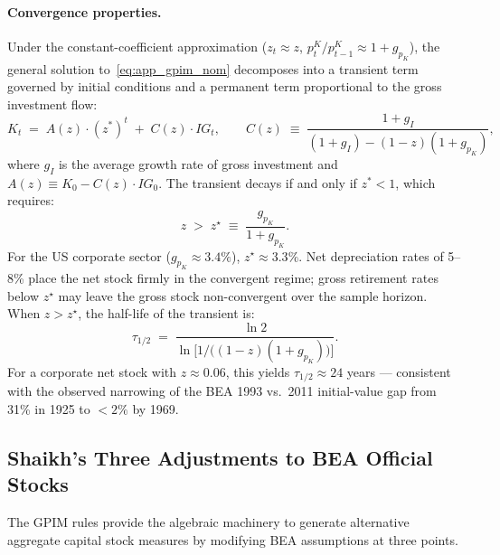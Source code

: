\paragraph{Convergence properties.}
Under the constant-coefficient approximation
($z_t \approx z$, $p_t^{K}/p_{t-1}^{K} \approx 1 + g_{p_K}$), the
general solution to~\eqref{eq:app_gpim_nom} decomposes into a transient
term governed by initial conditions and a permanent term proportional to
the gross investment flow:
%
\begin{equation}
  \label{eq:app_gen_solution}
  K_t \;=\; A(z)\cdot(z^{\ast})^t \;+\; C(z)\cdot IG_t,
  \qquad
  C(z) \;\equiv\;
  \frac{1+g_I}{(1+g_I)-(1-z)(1+g_{p_K})},
\end{equation}
%
where $g_I$ is the average growth rate of gross investment and
$A(z) \equiv K_0 - C(z)\cdot IG_0$. The transient decays if and only if
$z^{\ast} < 1$, which requires:
%
\begin{equation}
  \label{eq:app_critical_z}
  z \;>\; z^{\star} \;\equiv\; \frac{g_{p_K}}{1+g_{p_K}}.
\end{equation}
%
For the US corporate sector ($g_{p_K} \approx 3.4\%$),
$z^{\star} \approx 3.3\%$. Net depreciation rates of 5--8\% place the
net stock firmly in the convergent regime; gross retirement rates below
$z^{\star}$ may leave the gross stock non-convergent over the sample
horizon. When $z > z^{\star}$, the half-life of the transient is:
%
\begin{equation}
  \label{eq:app_halflife}
  \tau_{1/2} \;=\;
  \frac{\ln 2}{\ln\!\bigl[1/\bigl((1-z)(1+g_{p_K})\bigr)\bigr]}.
\end{equation}
%
For a corporate net stock with $z \approx 0.06$, this yields
$\tau_{1/2} \approx 24$ years --- consistent with the observed narrowing
of the BEA 1993 vs.\ 2011 initial-value gap from 31\% in 1925 to
$<2\%$ by 1969.


\subsection{Shaikh's Three Adjustments to BEA Official Stocks}
\label{app:gpim_adjustments}

The GPIM rules provide the algebraic machinery to generate alternative
aggregate capital stock measures by modifying BEA assumptions at three
points.

